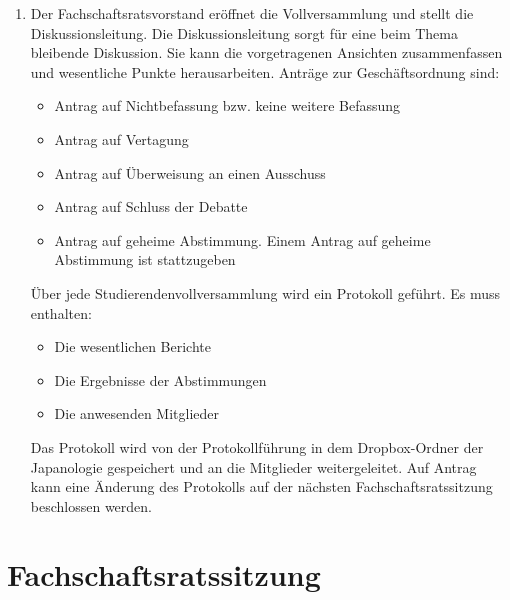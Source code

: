 \documentclass[12pt]{scrartcl}
\begin{document}
\begin{enumerate}
	\item Der Fachschaftsratsvorstand eröffnet die Vollversammlung und stellt die Diskussionsleitung. Die Diskussionsleitung sorgt für eine beim Thema bleibende Diskussion. Sie kann die vorgetragenen Ansichten zusammenfassen und wesentliche Punkte herausarbeiten. Anträge zur Geschäftsordnung sind:
	\begin{itemize}
		\item Antrag auf Nichtbefassung bzw. keine weitere Befassung
		\item Antrag auf Vertagung
		\item Antrag auf Überweisung an einen Ausschuss
		\item Antrag auf Schluss der Debatte
		\item Antrag auf geheime Abstimmung. Einem Antrag auf geheime Abstimmung ist stattzugeben
	\end{itemize}
	Über jede Studierendenvollversammlung wird ein Protokoll geführt. Es muss enthalten:
	\begin{itemize}
		\item Die wesentlichen Berichte
		\item Die Ergebnisse der Abstimmungen
		\item Die anwesenden Mitglieder
	\end{itemize}
	Das Protokoll wird von der Protokollführung in dem Dropbox-Ordner der Japanologie gespeichert und an die Mitglieder weitergeleitet. Auf Antrag kann eine Änderung des Protokolls auf der nächsten Fachschaftsratssitzung beschlossen werden.
\end{enumerate}

\section{Fachschaftsratssitzung}
\end{document}
